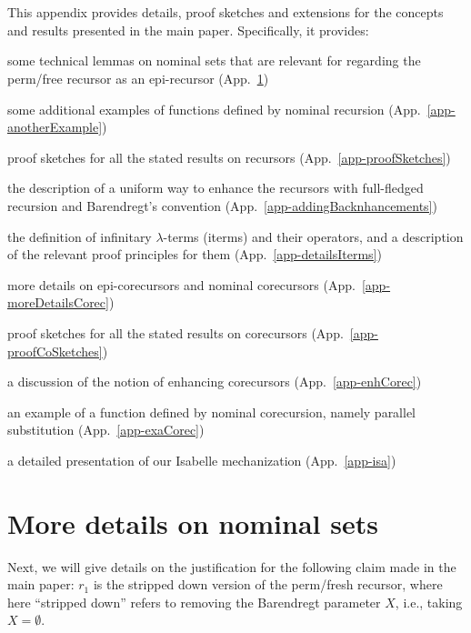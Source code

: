 \ \\ \ \par
This  appendix provides details, proof sketches and extensions for the concepts and results presented in the main paper. Specifically, it provides:
\begin{mmyitem}
	\item some technical lemmas on nominal sets that are relevant for regarding the perm/free recursor %
	 as an epi-recursor (App.~\ref{app-modreDetailsNomSets})
	 \item some additional examples of functions defined by nominal recursion 
	 (App.~\ref{app-anotherExample}) 
	\item proof sketches for all the stated results on recursors (App.~\ref{app-proofSketches})
	\item the description of a uniform way to enhance the recursors with full-fledged recursion and Barendregt's convention (App.~\ref{app-addingBacknhancements})
	\item the definition of infinitary $\lambda$-terms (iterms) and their operators, and a description of the relevant proof principles for them (App.~\ref{app-detailsIterms})
	\item more details on epi-corecursors and nominal corecursors (App.~\ref{app-moreDetailsCorec})
 	\item proof sketches for all the stated results on corecursors (App.~\ref{app-proofCoSketches})
 	\item a discussion of the notion of enhancing corecursors  (App.~\ref{app-enhCorec})
 	 \item an  example of a function defined by nominal corecursion, namely parallel substitution 
 	(App.~\ref{app-exaCorec}) 
	\item a detailed presentation of our Isabelle mechanization (App.~\ref{app-isa})
\end{mmyitem} 

\section{More details on nominal sets}
\label{app-modreDetailsNomSets}

Next, we will give details on the justification for the following claim made in the main paper: $r_1$ is the stripped down version of the perm/fresh  recursor, where here ``stripped down'' refers to removing the Barendregt parameter $X$, i.e., taking $X=\emptyset$. 

